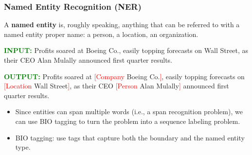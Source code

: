 \documentclass[handout]{beamer}
\begin{document}
\begin{frame}
  \frametitle{Named Entity Recognition (NER)}
  \scriptsize
  A \textbf{named entity} is, roughly speaking, anything that can be referred to with a named entity proper name: a person, a location, an organization.\vspace{0.5cm}


  \textcolor{green}{\textbf{INPUT:}}
  Profits soared at Boeing Co., easily topping forecasts on Wall Street, as their CEO Alan Mulally announced first quarter results.    \vspace{0.5cm}

  \textcolor{green}{\textbf{OUTPUT:}}
  Profits soared at \textcolor{red}{[Company} Boeing Co.\textcolor{red}{]}, easily topping forecasts on \textcolor{red}{[Location} Wall Street\textcolor{red}{]}, as their CEO \textcolor{red}{[Person} Alan Mulally\textcolor{red}{]} announced first quarter results. \vspace{0.5cm}

  \begin{itemize}
   \item  Since entities can span multiple words (i.e., a span recognition problem), we can use BIO tagging \cite{ramshaw1999text} to turn the problem into a sequence labeling problem.
   \item   BIO tagging: use tags that capture both the boundary and the named entity type.
  \end{itemize}



\end{frame}
\end{document}
